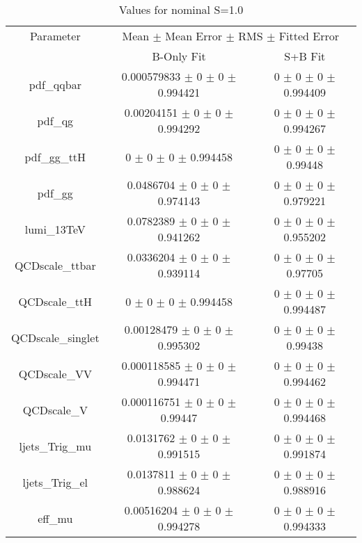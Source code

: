 \begin{table}
\centering
\caption{Values for nominal S=1.0}
\begin{tabular}{ccc}
\toprule
Parameter & \multicolumn{2}{c}{Mean $\pm$ Mean Error $\pm$ RMS $\pm$ Fitted Error}\\
 & B-Only Fit & S+B Fit\\
\midrule
pdf\_qqbar & \num{0.000579833} $\pm$ \num{0} $\pm$ \num{0} $\pm$ \num{0.994421} & \num{0} $\pm$ \num{0} $\pm$ \num{0} $\pm$ \num{0.994409}\\
pdf\_qg & \num{0.00204151} $\pm$ \num{0} $\pm$ \num{0} $\pm$ \num{0.994292} & \num{0} $\pm$ \num{0} $\pm$ \num{0} $\pm$ \num{0.994267}\\
pdf\_gg\_ttH & \num{0} $\pm$ \num{0} $\pm$ \num{0} $\pm$ \num{0.994458} & \num{0} $\pm$ \num{0} $\pm$ \num{0} $\pm$ \num{0.99448}\\
pdf\_gg & \num{0.0486704} $\pm$ \num{0} $\pm$ \num{0} $\pm$ \num{0.974143} & \num{0} $\pm$ \num{0} $\pm$ \num{0} $\pm$ \num{0.979221}\\
lumi\_13TeV & \num{0.0782389} $\pm$ \num{0} $\pm$ \num{0} $\pm$ \num{0.941262} & \num{0} $\pm$ \num{0} $\pm$ \num{0} $\pm$ \num{0.955202}\\
QCDscale\_ttbar & \num{0.0336204} $\pm$ \num{0} $\pm$ \num{0} $\pm$ \num{0.939114} & \num{0} $\pm$ \num{0} $\pm$ \num{0} $\pm$ \num{0.97705}\\
QCDscale\_ttH & \num{0} $\pm$ \num{0} $\pm$ \num{0} $\pm$ \num{0.994458} & \num{0} $\pm$ \num{0} $\pm$ \num{0} $\pm$ \num{0.994487}\\
QCDscale\_singlet & \num{0.00128479} $\pm$ \num{0} $\pm$ \num{0} $\pm$ \num{0.995302} & \num{0} $\pm$ \num{0} $\pm$ \num{0} $\pm$ \num{0.99438}\\
QCDscale\_VV & \num{0.000118585} $\pm$ \num{0} $\pm$ \num{0} $\pm$ \num{0.994471} & \num{0} $\pm$ \num{0} $\pm$ \num{0} $\pm$ \num{0.994462}\\
QCDscale\_V & \num{0.000116751} $\pm$ \num{0} $\pm$ \num{0} $\pm$ \num{0.99447} & \num{0} $\pm$ \num{0} $\pm$ \num{0} $\pm$ \num{0.994468}\\
ljets\_Trig\_mu & \num{0.0131762} $\pm$ \num{0} $\pm$ \num{0} $\pm$ \num{0.991515} & \num{0} $\pm$ \num{0} $\pm$ \num{0} $\pm$ \num{0.991874}\\
ljets\_Trig\_el & \num{0.0137811} $\pm$ \num{0} $\pm$ \num{0} $\pm$ \num{0.988624} & \num{0} $\pm$ \num{0} $\pm$ \num{0} $\pm$ \num{0.988916}\\
eff\_mu & \num{0.00516204} $\pm$ \num{0} $\pm$ \num{0} $\pm$ \num{0.994278} & \num{0} $\pm$ \num{0} $\pm$ \num{0} $\pm$ \num{0.994333}\\

\end{tabular}
\end{table}
